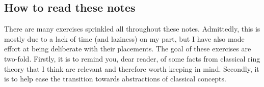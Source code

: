     \subsection{How to read these notes}
        There are many exercises sprinkled all throughout these notes. Admittedly, this is mostly due to a lack of time (and laziness) on my part, but I have also made effort at being deliberate with their placements. The goal of these exercises are two-fold. Firstly, it is to remind you, dear reader, of some facts from classical ring theory that I think are relevant and therefore worth keeping in mind. Secondly, it is to help ease the transition towards abstractions of classical concepts.